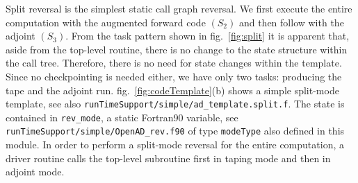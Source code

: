 \documentclass{book}
\newcommand{\reffig}[1]{{fig.~\ref{#1}}}
\begin{document}
Split reversal is the simplest static call graph reversal. We first execute the entire computation 
with the augmented forward code $(S_2)$ and then 
follow with the adjoint $(S_3)$. 
From the task pattern 
shown in \reffig{fig:split} it is 
apparent that, aside from the top-level routine, there is 
no change to the state structure within the call tree.
Therefore, there is no need for state changes within the template. 
Since no checkpointing is needed either, we have only two tasks: 
producing the tape and the adjoint run.
\reffig{fig:codeTemplate}(b) shows a simple split-mode template, see also \lstinline{runTimeSupport/simple/ad_template.split.f}.
The state is contained in \lstinline{rev_mode}, a static Fortran90 variable, see \lstinline{runTimeSupport/simple/OpenAD_rev.f90}
of type \lstinline{modeType} also defined in this module.  
In order to perform a split-mode reversal for the entire computation, a driver routine 
calls the top-level subroutine first in taping mode and then in adjoint mode.
\end{document}
